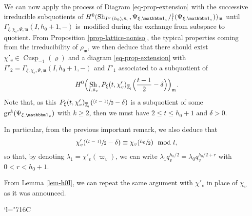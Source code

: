 \documentclass[JEP,XML,SOM,Unicode,published]{cedram}
\let\mathds\mathbbm
\newenvironment{enumeratea}
{\bgroup\def\theenumi{\alph{enumi}}\begin{enumerate}}
{\end{enumerate}\egroup}
\newcommand{\Changelback}{\mathcode`l="716C}
\newcommand{\NoChangel}[1]{%
\expandafter\let\csname old\string#1\endcsname=#1
\let#1=\relax
\newcommand{#1}{\mathcode`l="716C\csname old\string#1\endcsname\mathcode`l="7160 }%
}
\newcommand{\psfrac}[2]{\sfrac{(#1)}{#2}}
\theoremstyle{plain}
\theoremstyle{definition}
\numberwithin{equation}{subsection}
\newcommand\Zm{{\mathbb Z}}
\DeclareMathOperator{\sh}{Sh}
\DeclareMathOperator{\cusp}{Cusp}
\DeclareMathOperator{\gr}{gr}
\DeclareMathOperator{\Fil}{Fil}\NoChangel{\Fil}
\begin{document}
\begin{enumeratea}
We can now apply the process of Diagram \eqref{eq-prop-extension} with
the successive irreducible subquotients of $H^0(\sh_{I^w(h_0),\bar s_v},
\Psi_{\xi,\mathds 1_v}/\Fil^1_!(\Psi_{\xi,\mathds 1_v}))_{\mathfrak m}$
until $\Gamma_{\xi,\chi_v,\Psi,\mathfrak m} (I,h_0+1,-)$ is~modified during
the exchange from subspace to quotient. From Proposition \ref{prop-lattice-noniso},
the typical properties coming from the irreducibility of $\rho_{\mathfrak m}$,
we then deduce that there should exist $\chi'_v \in \cusp_{-1}(\varrho)$
and a diagram \eqref{eq-prop-extension} with
\hbox{$\Gamma'_2=\Gamma_{\xi,\chi_v,\Psi,\mathfrak m} (I,h_0+1,-)$}
and $\Gamma'_1$ associated to a subquotient of
\[
H^0\Bigl(\sh_{I,\bar s_v},
P_\xi(t,\chi'_v)_{\overline \Zm_l}\Bigl(\frac{t-1}{2}-\delta\Bigr)\Bigr)_{\mathfrak m}.
\]
Note that,
as this $P_\xi(t,\chi'_v)_{\overline \Zm_l}(\psfrac{t-1}{2}- \delta)$ is a subquotient of some
$\gr^k_!(\Psi_{\xi,\mathds 1_v})$ with $k \geq 2$, then we must have
$2 \leq t \leq h_0+1$ and $\delta>0$.

In particular, from the previous important remark,
we also deduce that
\[
\chi'_v(\psfrac{t-1}{2}-\delta) \equiv
\chi_v(\sfrac{h_0}{2}) \mod l,
\]
so that, by denoting $\lambda_1=\chi'_v(\varpi_v)$,
we can write $\lambda_1 q_v^{h_0/2}=\lambda_0 q_v^{h_0/2+r}$
with $0 < r <h_0+1$.

From Lemma \ref{lem-h0I}, we can repeat the same argument
with $\chi'_v$ in place of $\chi_v$ as it was announced.
\end{enumeratea}

\Changelback
\backmatter


\end{document}
